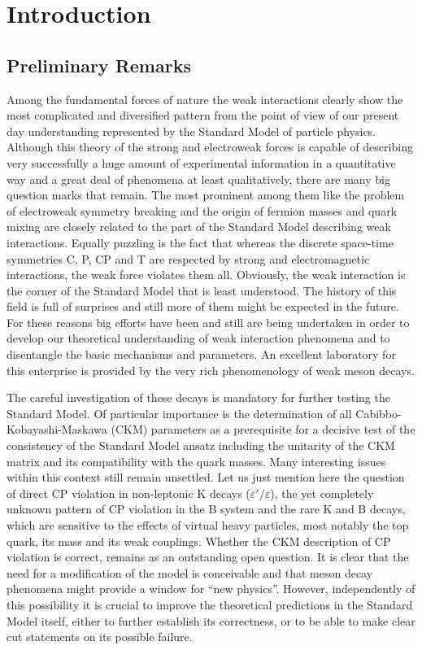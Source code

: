 \section{Introduction}
         \label{sec:intro}
\subsection{Preliminary Remarks}
            \label{sec:intro:rem}
Among the fundamental forces of nature the weak interactions clearly
show the most complicated and diversified pattern from the point of
view of our present day understanding represented by the
Standard Model of particle physics.
Although this theory of the strong and electroweak
forces is capable of describing very successfully a huge amount of
experimental information in a quantitative way
and a great deal of phenomena at least qualitatively, there are many
big question marks that remain. The most prominent among them like the
problem of electroweak symmetry breaking and the origin of
fermion masses and quark
mixing are closely related to the part of the Standard Model describing
weak interactions. Equally puzzling is the fact that whereas the
discrete space-time symmetries C, P, CP and T are respected by strong and
electromagnetic interactions, the weak force violates them all.
Obviously, the weak interaction is the corner of the Standard Model
that is least understood. The history of this field is full of
surprises and still more of them might be expected in the future.
\\
For these reasons big efforts have been and still are being
undertaken in order to develop our theoretical understanding of weak
interaction phenomena and to disentangle the basic mechanisms and
parameters.
An excellent laboratory for this enterprise is provided by the very
rich phenomenology of weak meson decays.

The careful investigation of these decays is mandatory for further
testing the Standard Model. Of particular importance is the
determination of all Cabibbo-Kobayashi-Maskawa (CKM) parameters as a
prerequisite for a decisive test of the consistency of the Standard
Model ansatz including the unitarity of the CKM matrix and its
compatibility with the quark masses.  Many interesting issues within
this context still remain unsettled. Let us just mention here the
question of direct CP violation in non-leptonic K decays
($\varepsilon'/\varepsilon$), the yet completely unknown pattern of CP
violation in the B system and the rare K and B decays, which are
sensitive to the effects of virtual heavy particles, most notably the
top quark, its mass and its weak couplings.  Whether the CKM
description of CP violation is correct, remains as an outstanding open
question.  It is clear that the need for a modification of the model is
conceivable and that meson decay phenomena might provide a window for
``new physics''. However, independently of this possibility it is
crucial to improve the theoretical predictions in the Standard Model
itself, either to further establish its correctness, or to be able to
make clear cut statements on its possible failure.

